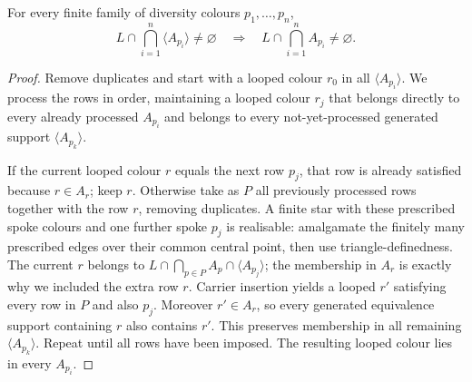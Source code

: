 \begin{lemma}\label{lem:rh-loophelly}
For every finite family of diversity colours $p_1,\dots,p_n$,
\[
 L\cap\bigcap_{i=1}^n\langle A_{p_i}\rangle\ne\varnothing
 \quad\Longrightarrow\quad
 L\cap\bigcap_{i=1}^n A_{p_i}\ne\varnothing.
\]
\end{lemma}
\begin{proof}
Remove duplicates and start with a looped colour $r_0$ in all
$\langle A_{p_i}\rangle$. We process the rows in order, maintaining
a looped colour $r_j$ that belongs directly to every already processed
$A_{p_i}$ and belongs to every not-yet-processed generated support
$\langle A_{p_k}\rangle$.

If the current looped colour $r$ equals the next row $p_j$, that row
is already satisfied because $r\in A_r$; keep $r$.
Otherwise take as $P$ all previously processed rows together with
the row $r$, removing duplicates. A finite star with these prescribed
spoke colours and one further spoke $p_j$ is realisable: amalgamate
the finitely many prescribed edges over their common central point,
then use triangle-definedness. The current $r$ belongs to
$L\cap\bigcap_{p\in P}A_p\cap\langle A_{p_j}\rangle$;
the membership in $A_r$ is exactly why we included the extra row $r$.
Carrier insertion yields a looped $r'$ satisfying every row in $P$
and also $p_j$. Moreover $r'\in A_r$, so every generated equivalence
support containing $r$ also contains $r'$. This preserves membership
in all remaining $\langle A_{p_k}\rangle$. Repeat until all rows
have been imposed. The resulting looped colour lies in every $A_{p_i}$.
\end{proof}

